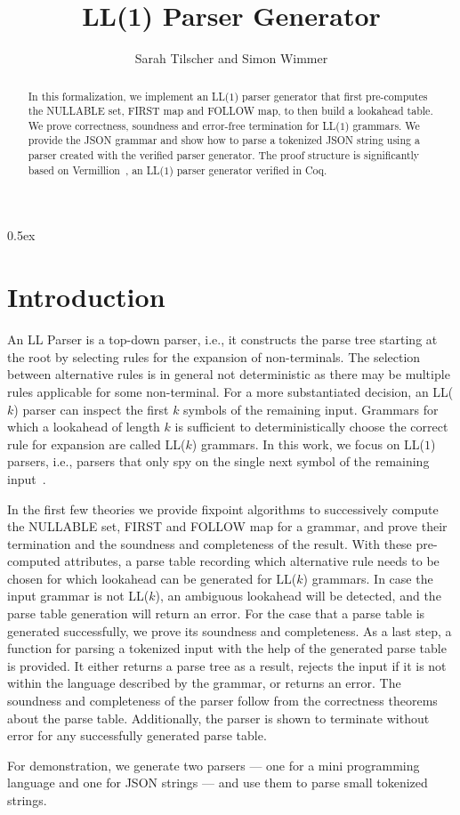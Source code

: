 \documentclass[11pt,a4paper]{article}
\begin{document}
\title{LL(1) Parser Generator}
\author{Sarah Tilscher and Simon Wimmer}
\maketitle

\begin{abstract}
In this formalization, we implement an LL($1$) parser generator that first pre-computes the NULLABLE set, FIRST map and FOLLOW map, to then build a lookahead table.
We prove correctness, soundness and error-free termination for LL($1$) grammars.
We provide the JSON grammar and show how to parse a tokenized JSON string using a parser created with the verified parser generator.
The proof structure is significantly based on Vermillion~\cite{lasser_et_al:LIPIcs:2019:11079}, an LL($1$) parser generator verified in Coq.
\end{abstract}

\tableofcontents

\parindent 0pt\parskip 0.5ex

\section{Introduction}

An LL Parser is a top-down parser, i.e., it constructs the parse tree starting at the root
by selecting rules for the expansion of non-terminals. The selection between alternative rules is in
general not deterministic as there may be multiple rules applicable for some non-terminal. For a
more substantiated decision, an LL($k$) parser can inspect the first $k$ symbols of the remaining input.
Grammars for which a lookahead of length $k$ is sufficient to deterministically choose the correct
rule for expansion are called LL($k$) grammars. In this work, we focus on LL($1$) parsers, i.e., parsers
that only spy on the single next symbol of the remaining input~\cite{DBLP:books/daglib/0031526}.

In the first few theories we provide fixpoint algorithms to successively compute the NULLABLE set, FIRST and FOLLOW map for a grammar,
and prove their termination and the soundness and completeness of the result.
With these pre-computed attributes, a parse table recording which alternative rule needs to be chosen for which lookahead can be generated for LL($k$) grammars.
In case the input grammar is not LL($k$), an ambiguous lookahead will be detected, and the parse table generation will return an error.
For the case that a parse table is generated successfully, we prove its soundness and completeness.
As a last step, a function for parsing a tokenized input with the help of the generated parse table is provided.
It either returns a parse tree as a result, rejects the input if it is not within the language described by the grammar, or returns an error.
The soundness and completeness of the parser follow from the correctness theorems about the parse table.
Additionally, the parser is shown to terminate without error for any successfully generated parse table.

For demonstration, we generate two parsers --- one for a mini programming language and one for JSON strings --- and use them to parse small tokenized strings.





\end{document}
